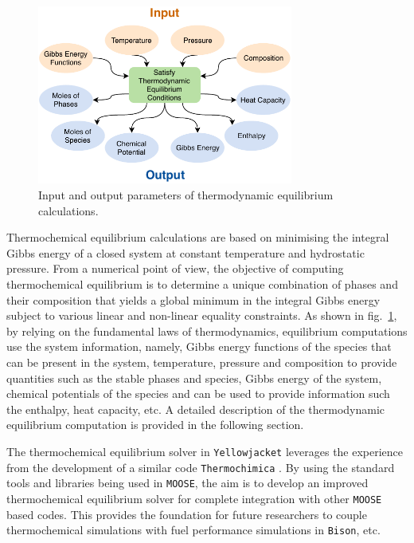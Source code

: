     \begin{figure}
        \centering
        \includegraphics[width=0.75\textwidth]{figures/Thermodynamics.pdf}
        \caption{Input and output parameters of thermodynamic equilibrium calculations.}
        \label{fig:Thermodintro}
    \end{figure}
    
    Thermochemical equilibrium calculations are based on minimising the integral Gibbs energy of a closed system at constant temperature and hydrostatic pressure. From a numerical point of view, the objective of computing thermochemical equilibrium is to determine a unique combination of phases and their composition that yields a global minimum in the integral Gibbs energy subject to various linear and non-linear equality constraints. As shown in fig.~\ref{fig:Thermodintro}, by relying on the fundamental laws of thermodynamics, equilibrium computations use the system information, namely, Gibbs energy functions of the species that can be present in the system, temperature, pressure and composition to provide quantities such as the stable phases and species, Gibbs energy of the system, chemical potentials of the species and can be used to provide information such the enthalpy, heat capacity, etc. A detailed description of the thermodynamic equilibrium computation is provided in the following section.
    
    The thermochemical equilibrium solver in \texttt{Yellowjacket} leverages the experience from the development of a similar code \texttt{Thermochimica} \cite{Piro13}. By using the standard tools and libraries being used in \texttt{MOOSE}, the aim is to develop an improved thermochemical equilibrium solver for complete integration with other \texttt{MOOSE} based codes. This provides the foundation for future researchers to couple thermochemical simulations with fuel performance simulations in \texttt{Bison}, etc.
    	
